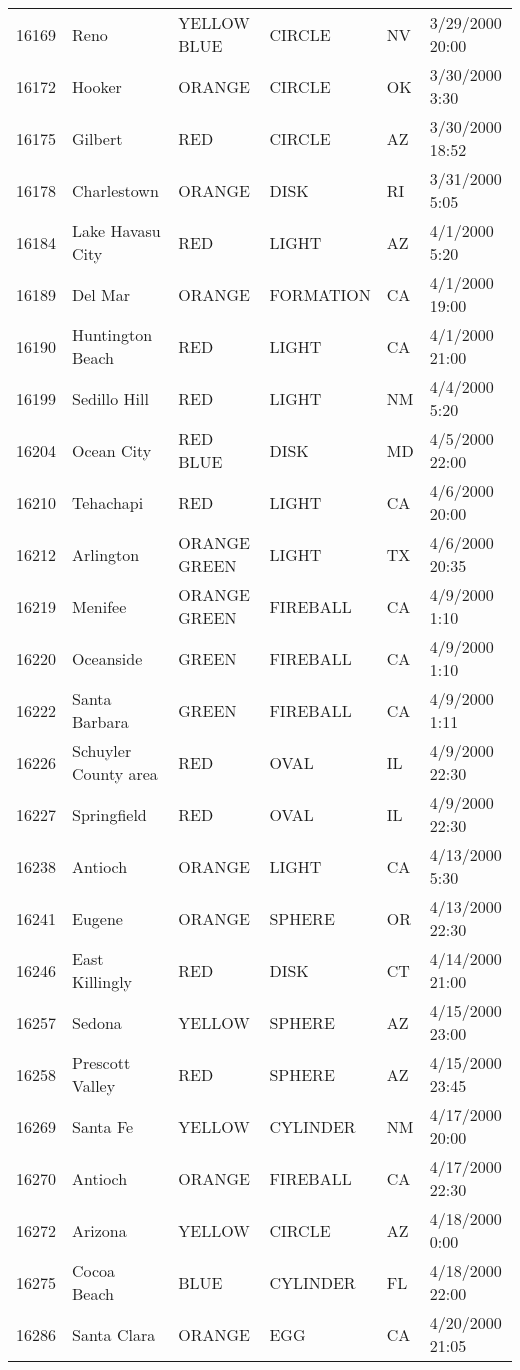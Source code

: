 \begin{tabular}{llllll}
16169 & Reno & YELLOW BLUE & CIRCLE & NV & 3/29/2000 20:00 \\
16172 & Hooker & ORANGE & CIRCLE & OK & 3/30/2000 3:30 \\
16175 & Gilbert & RED & CIRCLE & AZ & 3/30/2000 18:52 \\
16178 & Charlestown & ORANGE & DISK & RI & 3/31/2000 5:05 \\
16184 & Lake Havasu City & RED & LIGHT & AZ & 4/1/2000 5:20 \\
16189 & Del Mar & ORANGE & FORMATION & CA & 4/1/2000 19:00 \\
16190 & Huntington Beach & RED & LIGHT & CA & 4/1/2000 21:00 \\
16199 & Sedillo Hill & RED & LIGHT & NM & 4/4/2000 5:20 \\
16204 & Ocean City & RED BLUE & DISK & MD & 4/5/2000 22:00 \\
16210 & Tehachapi & RED & LIGHT & CA & 4/6/2000 20:00 \\
16212 & Arlington & ORANGE GREEN & LIGHT & TX & 4/6/2000 20:35 \\
16219 & Menifee & ORANGE GREEN & FIREBALL & CA & 4/9/2000 1:10 \\
16220 & Oceanside & GREEN & FIREBALL & CA & 4/9/2000 1:10 \\
16222 & Santa Barbara & GREEN & FIREBALL & CA & 4/9/2000 1:11 \\
16226 & Schuyler County area & RED & OVAL & IL & 4/9/2000 22:30 \\
16227 & Springfield & RED & OVAL & IL & 4/9/2000 22:30 \\
16238 & Antioch & ORANGE & LIGHT & CA & 4/13/2000 5:30 \\
16241 & Eugene & ORANGE & SPHERE & OR & 4/13/2000 22:30 \\
16246 & East Killingly & RED & DISK & CT & 4/14/2000 21:00 \\
16257 & Sedona & YELLOW & SPHERE & AZ & 4/15/2000 23:00 \\
16258 & Prescott Valley & RED & SPHERE & AZ & 4/15/2000 23:45 \\
16269 & Santa Fe & YELLOW & CYLINDER & NM & 4/17/2000 20:00 \\
16270 & Antioch & ORANGE & FIREBALL & CA & 4/17/2000 22:30 \\
16272 & Arizona & YELLOW & CIRCLE & AZ & 4/18/2000 0:00 \\
16275 & Cocoa Beach & BLUE & CYLINDER & FL & 4/18/2000 22:00 \\
16286 & Santa Clara & ORANGE & EGG & CA & 4/20/2000 21:05 \\

\end{tabular}
